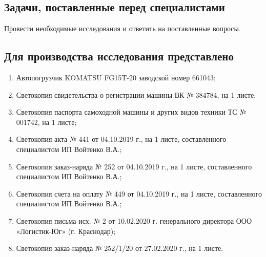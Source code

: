 \subsection{Задачи, поставленные перед специалистами}

Провести необходимые исследования и ответить на поставленные вопросы.

\subsection{Для производства исследования представлено}

\begin{enumerate}
    \item 	Автопогрузчик KOMATSU FG15T-20 заводской номер 661043;
    \item 	Светокопия свидетельства о регистрации машины  ВК № 384784,  на 1 листе;
    \item 	Светокопия паспорта самоходной машины и других видов техники ТС № 001742, на 1 листе;
    \item 	Светокопия акта № 441 от 04.10.2019 г., на 1 листе, составленного специалистом ИП Войтенко В.А.;
    \item 	Светокопия заказ-наряда № 252 от 04.10.2019 г., на 1 листе, составленного специалистом ИП Войтенко В.А.;
    \item 	Светокопия счета на оплату № 449 от 04.10.2019 г., на 1 листе, составленного специалистом ИП Войтенко В.А.;
    \item 	Светокопия письма исх. № 2 от 10.02.2020 г. генерального директора ООО «Логистик-Юг» (г. Краснодар);
    \item 	Светокопия заказ-наряда № 252/1/20 от 27.02.2020 г., на 1 листе.
\end{enumerate}
%
%

%
